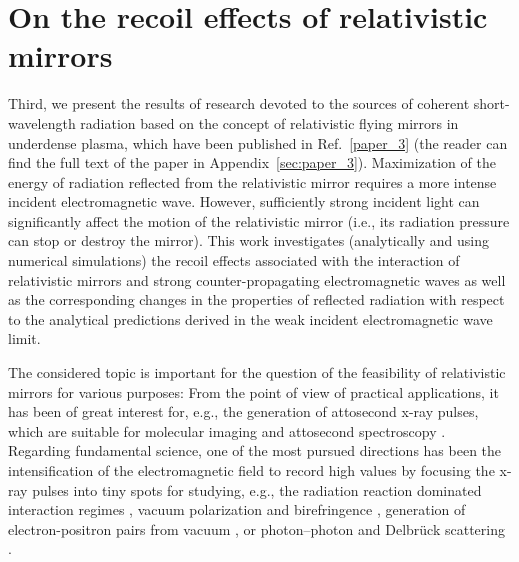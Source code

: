 \documentclass[10pt, a4paper, twoside, openright]{report}
\begin{document}
\section{On the recoil effects of relativistic mirrors\label{sec:on_the_recoil_effects_of_relativistic_mirrors}}
%

Third, we present the results of research devoted to the sources of coherent short-wavelength radiation based on the concept of relativistic flying mirrors in underdense plasma, which have been published in Ref.~\ref{paper_3} (the reader can find the full text of the paper in Appendix~\ref{sec:paper_3}). Maximization of the energy of radiation reflected from the relativistic mirror requires a more intense incident electromagnetic wave. However, sufficiently strong incident light can significantly affect the motion of the relativistic mirror (i.e., its radiation pressure can stop or destroy the mirror). This work investigates (analytically and using numerical simulations) the recoil effects associated with the interaction of relativistic mirrors and strong counter-propagating electromagnetic waves as well as the corresponding changes in the properties of reflected radiation with respect to the analytical predictions derived in the weak incident electromagnetic wave limit. 

The considered topic is important for the question of the feasibility of relativistic mirrors for various purposes: From the point of view of practical applications, it has been of great interest for, e.g., the generation of attosecond x-ray pulses, which are suitable for molecular imaging \cite{Neutze2000} and attosecond spectroscopy \cite{Krausz2009}. Regarding fundamental science, one of the most pursued directions has been the intensification of the electromagnetic field to record high values by focusing the x-ray pulses into tiny spots for studying, e.g., the radiation reaction dominated interaction regimes \cite{Zhidkov2002}, vacuum polarization and birefringence \cite{Dirac1934, Schwinger1951}, generation of electron-positron pairs from vacuum \cite{Heisenberg1936, Brezin1970, Narozhny1974}, or photon–photon and Delbrück scattering \cite{Koga2012, Koga2018}.

\end{document}
